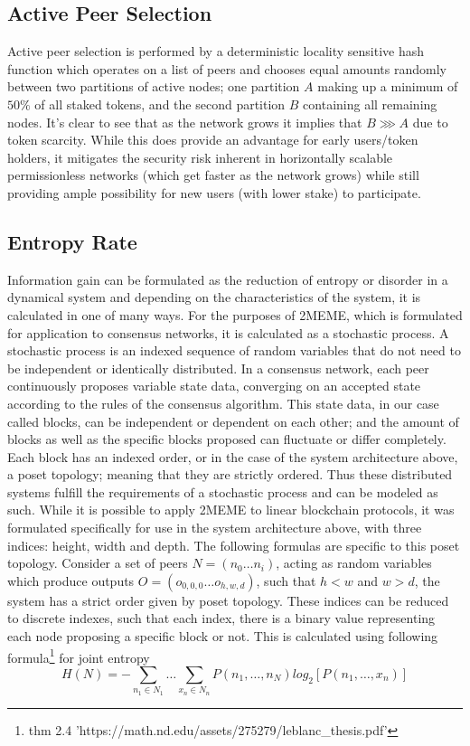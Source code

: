 \documentclass{article}
\begin{document}
\subsection{Active Peer Selection}
Active peer selection is performed by a deterministic locality sensitive hash function which operates on a list of peers and chooses equal amounts randomly between two partitions of active nodes; one partition $A$ making up a minimum of $50\%$ of all staked tokens, and the second partition $B$ containing all remaining nodes. It's clear to see that as the network grows it implies that $B \ggg A$ due to token scarcity. While this does provide an advantage for early users/token holders, it mitigates the security risk inherent in horizontally scalable permissionless networks (which get faster as the network grows) while still providing ample possibility for new users (with lower stake) to participate. 


\subsection{Entropy Rate}
Information gain can be formulated as the reduction of entropy or disorder in a dynamical system and depending on the characteristics of the system, it is calculated in one of many ways. For the purposes of 2MEME, which is formulated for application to consensus networks, it is calculated as a stochastic process.
	A stochastic process is an indexed sequence of random variables that do not need to be independent or identically distributed. In a consensus network, each peer continuously proposes variable state data, converging on an accepted state according to the rules of the consensus algorithm. This state data, in our case called blocks, can be independent or dependent on each other; and the amount of blocks as well as the specific blocks proposed can fluctuate or differ completely. Each block has an indexed order, or in the case of the system architecture above, a poset topology; meaning that they are strictly ordered. Thus these distributed systems fulfill the requirements of a stochastic process and can be modeled as such. While it is possible to apply 2MEME to linear blockchain protocols, it was formulated specifically for use in the system architecture above, with three indices: height, width and depth. The following formulas are specific to this poset topology.
	Consider a set of peers $N = (n_0 …n_i)$, acting as random variables which produce outputs $O = (o_{0,0,0} … o_{h,w,d})$, such that $h<w$ and $w>d$, the system has a strict order given by poset topology. These indices can be reduced to discrete indexes, such that each index, there is a binary value representing each node proposing a specific block or not. This is calculated using following formula\footnote{thm 2.4 'https://math.nd.edu/assets/275279/leblanc\_thesis.pdf'} for joint entropy	
\begin{equation}
H(N) = -\sum_{n_1 \in N_1} \dots \sum_{x_n \in N_n} P(n_1,  \dots, n_N) log_2 [P(n_1, \dots, x_n)]
\end{equation}
	
\end{document}
